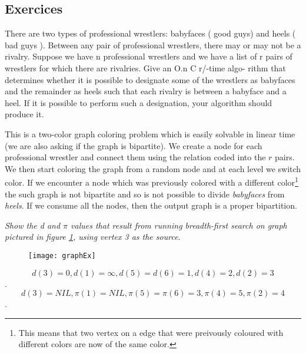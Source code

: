 \subsection{Exercices}
\begin{problem}
There are two types of professional wrestlers:  babyfaces  ( good guys) and
heels ( bad guys ). Between any pair of professional wrestlers, there may or
may not be a rivalry. Suppose we have n professional wrestlers and we have a list
of r pairs of wrestlers for which there are rivalries. Give an O.n C r/-time algo-
rithm that determines whether it is possible to designate some of the wrestlers as
babyfaces and the remainder as heels such that each rivalry is between a babyface
and a heel. If it is possible to perform such a designation, your algorithm should
produce it.
\begin{solution}
This is a two-color graph coloring problem which is easily solvable in linear time (we are also asking if the graph is bipartite).
We create a node for each professional wrestler and connect them using the relation coded into the $r$ pairs. We then start coloring the graph from a random node and at each level we switch color. If we encounter a node which was previously colored with a different color\footnote{This means that two vertex on a edge that were preivously coloured with different colors are now of the same color.} the such graph is not bipartite and so is not possible to divide \textit{babyfaces} from \textit{heels}. If we consume all the nodes, then the output graph is a proper bipartition.
\end{solution}


\end{problem}



\begin{problem}
\textit{Show the d and $\pi$ values that result from running breadth-first search on graph pictured in figure \ref{fig:graphex}, using vertex 3 as the source}.


	\begin{figure}
	\label{fig:graphex}
	\centering
		\texttt{[image: graphEx]}
	\end{figure}
\begin{solution}
\[d(3) = 0 , d(1) = \infty , d(5) = d(6) = 1 , d(4) = 2 ,d(2) = 3\].
\[d(3) = NIL , \pi(1) = NIL , \pi(5) = \pi(6) = 3 , \pi(4) = 5 ,\pi(2) = 4\].
	\end{solution}
\end{problem}


